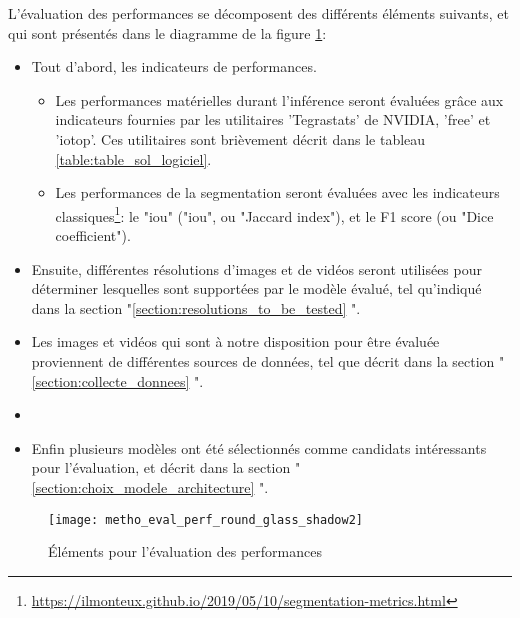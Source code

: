 ﻿L’évaluation des performances se décomposent des différents éléments suivants, et qui sont présentés dans le diagramme de la figure \ref{fig:metho_eval}: 
\begin{itemize}
    \item Tout d'abord, les indicateurs de performances.
    \begin{itemize}
        \item Les performances matérielles durant l'inférence seront évaluées grâce aux indicateurs fournies par les utilitaires 'Tegrastats' de NVIDIA, 'free' et 'iotop'. Ces utilitaires sont brièvement décrit dans le tableau \ref{table:table_sol_logiciel}.
        \item Les performances de la segmentation seront évaluées avec les indicateurs classiques\footnote{\url{https://ilmonteux.github.io/2019/05/10/segmentation-metrics.html}}: le "\acrshort{iou}" ("\acrlong{iou}", ou "Jaccard index"), et le F1 score (ou "Dice coefficient").
    \end{itemize}
    \item Ensuite, différentes résolutions d'images et de vidéos seront utilisées pour déterminer lesquelles sont supportées par le modèle évalué, tel qu'indiqué dans la section "\ref{section:resolutions_to_be_tested} ". 
    \item Les images et vidéos qui sont à notre disposition pour être évaluée proviennent de différentes sources de données, tel que décrit dans la section "\ref{section:collecte_donnees} ". 
    \item \item Enfin plusieurs modèles ont été sélectionnés comme candidats intéressants pour l'évaluation, et décrit dans la section "\ref{section:choix_modele_architecture} ".
\end{itemize} 
\label{metho_eval}
\begin{figure}[H]
    \centering
    \texttt{[image: metho\_eval\_perf\_round\_glass\_shadow2]}
    \caption{Éléments pour l'évaluation des performances}
    \label{fig:metho_eval}
\end{figure}

